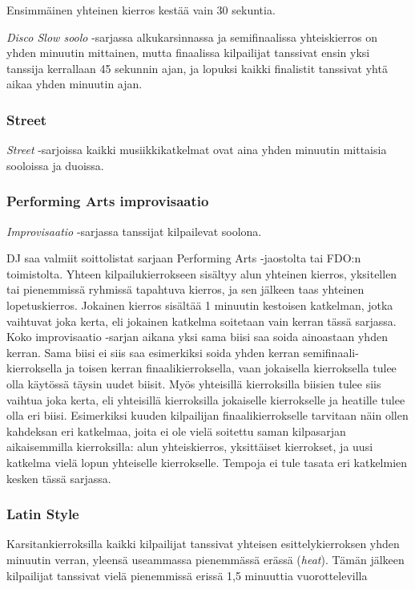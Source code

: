 \documentclass[12pt, a4paper, oneside]{article}
\begin{document}
Ensimmäinen yhteinen kierros kestää vain 30 sekuntia.

\textit{Disco Slow soolo} -sarjassa alkukarsinnassa ja semifinaalissa yhteiskierros on yhden minuutin mittainen,
mutta finaalissa kilpailijat tanssivat ensin yksi tanssija kerrallaan 45 sekunnin ajan,
ja lopuksi kaikki finalistit tanssivat yhtä aikaa yhden minuutin ajan.

\subsubsection{Street}

\textit{Street} -sarjoissa kaikki musiikkikatkelmat ovat aina yhden minuutin mittaisia sooloissa ja duoissa.

\subsubsection{Performing Arts improvisaatio}

\textit{Improvisaatio} -sarjassa tanssijat kilpailevat soolona.

DJ saa valmiit soittolistat sarjaan Performing Arts -jaostolta tai FDO:n toimistolta.
Yhteen kilpailukierrokseen sisältyy alun yhteinen kierros,
yksitellen tai pienemmissä ryhmissä tapahtuva kierros,
ja sen jälkeen taas yhteinen lopetuskierros.
Jokainen kierros sisältää 1 minuutin kestoisen katkelman,
jotka vaihtuvat joka kerta,
eli jokainen katkelma soitetaan vain kerran tässä sarjassa.
Koko improvisaatio -sarjan aikana yksi sama biisi saa soida ainoastaan yhden kerran.
Sama biisi ei siis saa esimerkiksi soida yhden kerran semifinaali-kierroksella ja toisen kerran finaalikierroksella,
vaan jokaisella kierroksella tulee olla käytössä täysin uudet biisit.
Myös yhteisillä kierroksilla biisien tulee siis vaihtua joka kerta,
eli yhteisillä kierroksilla jokaiselle kierrokselle ja heatille tulee olla eri biisi.
Esimerkiksi kuuden kilpailijan finaalikierrokselle tarvitaan näin ollen kahdeksan eri katkelmaa,
joita ei ole vielä soitettu saman kilpasarjan aikaisemmilla kierroksilla:
alun yhteiskierros,
yksittäiset kierrokset,
ja uusi katkelma vielä lopun yhteiselle kierrokselle.
Tempoja ei tule tasata eri katkelmien kesken tässä sarjassa.

\subsubsection{Latin Style}

Karsitankierroksilla kaikki kilpailijat tanssivat yhteisen esittelykierroksen yhden minuutin verran,
yleensä useammassa pienemmässä erässä (\textit{heat}).
Tämän jälkeen kilpailijat tanssivat vielä pienemmissä erissä 1,5 minuuttia vuorottelevilla
\end{document}
